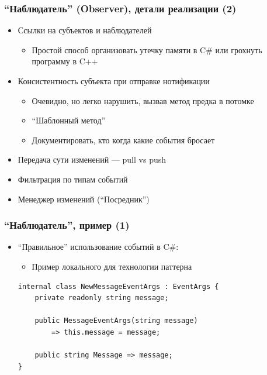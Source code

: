 \documentclass[xetex,mathserif,serif]{beamer}
\begin{document}
    \begin{frame}
        \frametitle{``Наблюдатель'' (Observer), детали реализации (2)}
        \begin{itemize}
            \item Ссылки на субъектов и наблюдателей
            \begin{itemize}
                \item Простой способ организовать утечку памяти в C\# или грохнуть программу в C++
            \end{itemize}
            \item Консистентность субъекта при отправке нотификации
            \begin{itemize}
                \item Очевидно, но легко нарушить, вызвав метод предка в потомке
                \item ``Шаблонный метод''
                \item Документировать, кто когда какие события бросает
            \end{itemize}
            \item Передача сути изменений --- pull vs push
            \item Фильтрация по типам событий
            \item Менеджер изменений (``Посредник'')
        \end{itemize}
    \end{frame}

    \begin{frame}[fragile]
        \frametitle{``Наблюдатель'', пример (1)}
        \begin{itemize}
            \item ``Правильное'' использование событий в C\#:
            \begin{itemize}
                \item Пример локального для технологии паттерна
            \end{itemize}
            \begin{verbatim}
internal class NewMessageEventArgs : EventArgs {
    private readonly string message;

    public MessageEventArgs(string message) 
        => this.message = message;

    public string Message => message;
}
            \end{verbatim}
        \end{itemize}
    \end{frame}
\end{document}

